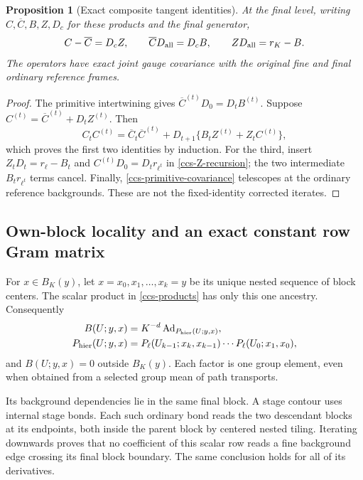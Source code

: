 \documentclass[11pt]{article}
\newtheorem{proposition}[theorem]{Proposition}
\theoremstyle{remark}
\begin{document}
\begin{proposition}[Exact composite tangent identities]
\label{ccs-composite-theorem}
At the final level, writing \(C,\overline C,B,Z,D_c\) for these
products and the final generator,
\begin{equation}
 C-\overline C=D_cZ,\qquad
 \overline C D_{\rm all}=D_cB,\qquad
                  ZD_{\rm all}=r_K-B.
 \label{ccs-composite-identities}
\end{equation}
The operators have exact joint gauge covariance with the original
fine and final ordinary reference frames.
\end{proposition}

\begin{proof}
The primitive intertwining gives
\(\overline C^{(t)}D_0=D_tB^{(t)}\).
Suppose \(C^{(t)}=\overline C^{(t)}+D_tZ^{(t)}\).
Then
\[
 C_tC^{(t)}
  =\overline C_t\overline C^{(t)}
        +D_{t+1}\{B_tZ^{(t)}+Z_tC^{(t)}\},
\]
which proves the first two identities by induction.
For the third, insert
\(Z_tD_t=r_\ell-B_t\) and
\(C^{(t)}D_0=D_tr_{\ell^t}\) in
\eqref{ccs-Z-recursion}; the two intermediate
\(B_tr_{\ell^t}\) terms cancel.
Finally, \eqref{ccs-primitive-covariance} telescopes at the
ordinary reference backgrounds. These are not the
fixed-identity corrected iterates.
\end{proof}

\subsection{Own-block locality and an exact constant row Gram matrix}
\label{ccs-locality-section}

For \(x\in B_K(y)\), let
\(x=x_0,x_1,\ldots,x_k=y\) be its unique nested sequence of
block centers. The scalar product in \eqref{ccs-products}
has only this one ancestry. Consequently
\begin{equation}
 \begin{split}
 B(U;y,x)&=K^{-d}\operatorname{Ad}_{P_{\rm hier}(U;y,x)},\\
 P_{\rm hier}(U;y,x)
  &=P_\ell(U_{k-1};x_k,x_{k-1})\cdots
                                 P_\ell(U_0;x_1,x_0),
 \end{split}
 \label{ccs-hierarchical-B}
\end{equation}
and \(B(U;y,x)=0\) outside \(B_K(y)\).
Each factor is one group element, even when obtained from a
selected group mean of path transports.

Its background dependencies lie in the same final block.
A stage contour uses internal stage bonds. Each such ordinary
bond reads the two descendant blocks at its endpoints, both
inside the parent block by centered nested tiling. Iterating
downwards proves that no coefficient of this scalar row reads
a fine background edge crossing its final block boundary.
The same conclusion holds for all of its derivatives.
\end{document}
